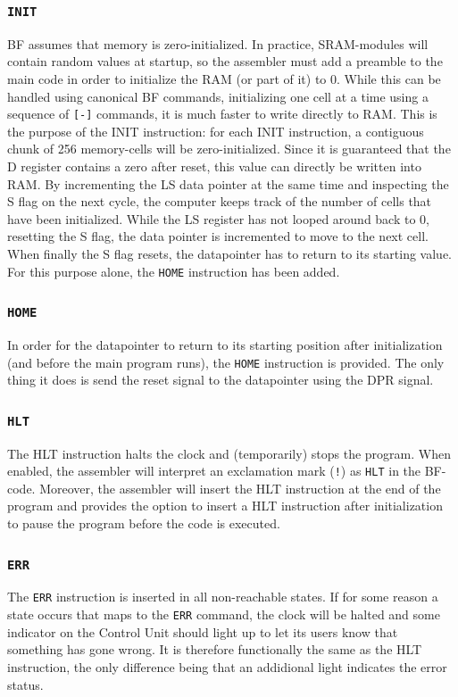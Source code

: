 \subsubsection{\texttt{INIT}} \label{sec:sequences:init}
BF assumes that memory is zero-initialized. In practice, SRAM-modules will contain random values at startup, so the assembler must add a preamble to the main code in order to initialize the RAM (or part of it) to 0. While this can be handled using canonical BF commands, initializing one cell at a time using a sequence of \texttt{[-]} commands, it is much faster to write directly to RAM. This is the purpose of the INIT instruction: for each INIT instruction, a contiguous chunk of 256 memory-cells will be zero-initialized. Since it is guaranteed that the D register contains a zero after reset, this value can directly be written into RAM. By incrementing the LS data pointer at the same time and inspecting the S flag on the next cycle, the computer keeps track of the number of cells that have been initialized. While the LS register has not looped around back to 0, resetting the S flag, the data pointer is incremented to move to the next cell. When finally the S flag resets, the datapointer has to return to its starting value. For this purpose alone, the \texttt{HOME} instruction has been added.

\subsubsection{\texttt{HOME}} \label{sec:sequences:home}
In order for the datapointer to return to its starting position after initialization (and before the main program runs), the \texttt{HOME} instruction is provided. The only thing it does is send the reset signal to the datapointer using the DPR signal.

\subsubsection{\texttt{HLT}}
The HLT instruction halts the clock and (temporarily) stops the program. When enabled, the assembler will interpret an exclamation mark (\texttt{!}) as \texttt{HLT} in the BF-code. Moreover, the assembler will insert the HLT instruction at the end of the program and provides the option to insert a HLT instruction after initialization to pause the program before the code is executed. 

\subsubsection{\texttt{ERR}}
The \texttt{ERR} instruction is inserted in all non-reachable states. If for some reason a state occurs that maps to the \texttt{ERR} command, the clock will be halted and some indicator on the Control Unit should light up to let its users know that something has gone wrong. It is therefore functionally the same as the HLT instruction, the only difference being that an addidional light indicates the error status.

